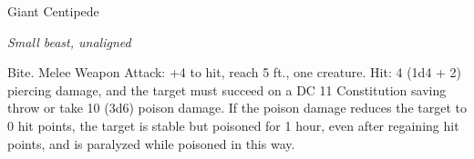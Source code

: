 \begin{monsterbox}{Giant Centipede}
\begin{hangingpar}
\textit{Small beast, unaligned}
\end{hangingpar}
\dndline%
\basics[%
armorclass = 13,
hitpoints = 1d6 + 1,
speed = {30 ft., climb 30 ft.}
]
\dndline%
\stats[%
STR = \stat{5},
DEX = \stat{14},
CON = \stat{12},
INT = \stat{1},
WIS = \stat{7},
CHA = \stat{3}
]
\dndline%
\details[%
skills={},
damageimmunities={},
savingthrows={},
conditionimmunities={},
damageresistances={},
damagevulnerabilities={},
senses={blindsight 30 ft., passive Perception 8},
challenge=1/4
]
\dndline%
\begin{monsteraction}[Bite]
Bite. Melee Weapon Attack: +4 to hit, reach 5 ft., one creature. Hit: 4 (1d4 + 2) piercing damage, and the target must succeed on a DC 11 Constitution saving throw or take 10 (3d6) poison damage. If the poison damage reduces the target to 0 hit points, the target is stable but poisoned for 1 hour, even after regaining hit points, and is paralyzed while poisoned in this way.
\end{monsteraction}
\end{monsterbox}